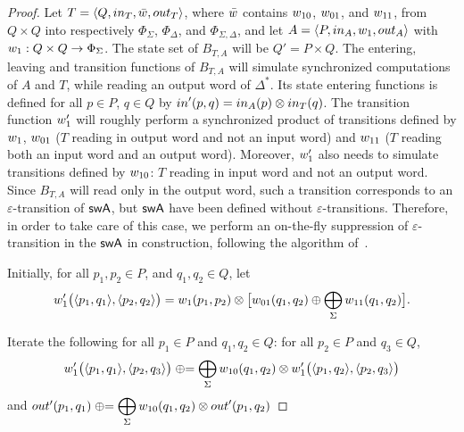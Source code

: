 \begin{proof}
Let $T = \< Q, \init_T, \bar{\wei}, \final_T >$,
where $\bar{\wei}$ contains $\wei_{10}$, $\wei_{01}$, and $\wei_{11}$,
from $Q \times Q$ into respectively 
$\Phi_{\Sigma}$, $\Phi_{\Delta}$, and $\Phi_{\Sigma, \Delta}$,
and let $A = \< P, \init_A, \wei_1, \final_A >$
with $\wei_1: Q \times Q \to \Phi_{\Sigma}$.
%
\noindent
The state set of $B_{T, A}$ will be $Q' = P \times Q$.
The entering, leaving and transition functions of $B_{T, A}$ will 
simulate synchronized computations of $A$ and $T$, 
while reading an output word of $\Delta^*$.
%
Its state entering functions is defined 
for all $p \in P$, $q \in Q$ 
by $\init'(p, q) = \init_A(p) \otimes \init_T(q)$.
The transition function $\wei'_1$ will roughly perform 
a synchronized product of transitions defined by $\wei_1$, 
$\wei_{01}$ ($T$ reading in output word and not an input word)
and $\wei_{11}$ ($T$ reading both an input word and an output word).
%
Moreover, $\wei'_1$ also needs to simulate transitions 
defined by $\wei_{10}$: $T$ reading in input word and not an output word.
Since $B_{T, A}$  will read only in the output word, such a transition corresponds
to an $\varepsilon$-transition of $\textsf{swA}$, 
but $\textsf{swA}$ have been defined without $\varepsilon$-transitions.
Therefore, in order to take care of this case, we perform an on-the-fly
suppression of $\varepsilon$-transition in the $\textsf{swA}$ in construction, 
following the algorithm of~\cite{LombardySakarovitch12ciaa}. 
%


\noindent
Initially, for all $p_1, p_2 \in P$, and $q_1, q_2 \in Q$, let
\[
\wei'_1\bigl( \< p_1, q_1>, \< p_2, q_2>\bigr) = 
\wei_1(p_1, p_2) \otimes
\bigl[
\wei_{01}(q_1, q_2) 
\oplus
\displaystyle\bigoplus_{\Sigma}
\wei_{11}(q_1, q_2) 
\bigr].
\]

\noindent
Iterate the following for all $p_1\in P$ and $q_1, q_2 \in Q$:
for all $p_2\in P$ and $q_3 \in Q$,
\[
\wei'_1\bigl( \< p_1, q_1>, \< p_2, q_3>\bigr) \opluseq 
\displaystyle\bigoplus_{\Sigma} \wei_{10}(q_1, q_2) 
\otimes 
\wei'_1\bigl( \< p_1, q_2>, \< p_2, q_3>\bigr)
\]
and
\(
\final'(p_1, q_1) \opluseq 
\displaystyle\bigoplus_{\Sigma} \wei_{10}(q_1, q_2) 
\otimes \final'(p_1, q_2)
\) 
\end{proof}

